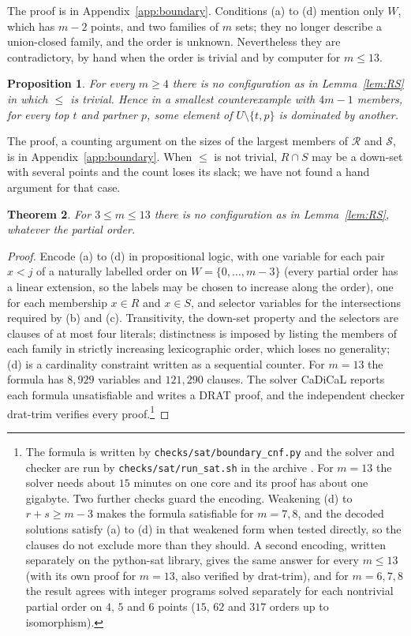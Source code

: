 \documentclass[aps,prd,twocolumn,superscriptaddress,nofootinbib,longbibliography,floatfix,amsmath,amssymb,10pt]{revtex4-2}
\theoremstyle{plain}
\newtheorem{theorem}{Theorem}[section]
\newtheorem{proposition}[theorem]{Proposition}
\theoremstyle{definition}
\theoremstyle{plain}
\begin{document}
The proof is in Appendix~\ref{app:boundary}. Conditions (a) to (d) mention only $W$, which has $m-2$ points, and two families of $m$ sets; they no longer describe a union-closed family, and the order is unknown. Nevertheless they are contradictory, by hand when the order is trivial and by computer for $m\le13$.

\begin{proposition}\label{prop:nodom}
For every $m\ge4$ there is no configuration as in Lemma~\ref{lem:RS} in which $\le$ is trivial. Hence in a smallest counterexample with $4m-1$ members, for every top $t$ and partner $p$, some element of $U\setminus\{t,p\}$ is dominated by another.
\end{proposition}

The proof, a counting argument on the sizes of the largest members of $\mathcal R$ and $\mathcal S$, is in Appendix~\ref{app:boundary}. When $\le$ is not trivial, $R\cap S$ may be a down-set with several points and the count loses its slack; we have not found a hand argument for that case.

\begin{theorem}\label{thm:sat}
For $3\le m\le 13$ there is no configuration as in Lemma~\ref{lem:RS}, whatever the partial order.
\end{theorem}

\begin{proof}
Encode (a) to (d) in propositional logic, with one variable for each pair $x<j$ of a naturally labelled order on $W=\{0,\dots,m-3\}$ (every partial order has a linear extension, so the labels may be chosen to increase along the order), one for each membership $x\in R$ and $x\in S$, and selector variables for the intersections required by (b) and (c). Transitivity, the down-set property and the selectors are clauses of at most four literals; distinctness is imposed by listing the members of each family in strictly increasing lexicographic order, which loses no generality; (d) is a cardinality constraint written as a sequential counter. For $m=13$ the formula has $8{,}929$ variables and $121{,}290$ clauses. The solver CaDiCaL reports each formula unsatisfiable and writes a DRAT proof, and the independent checker drat-trim verifies every proof.\footnote{The formula is written by \texttt{checks/sat/boundary\_cnf.py} and the solver and checker are run by \texttt{checks/sat/run\_sat.sh} in the archive \cite{BB26z}. For $m=13$ the solver needs about $15$ minutes on one core and its proof has about one gigabyte. Two further checks guard the encoding. Weakening (d) to $r+s\ge m-3$ makes the formula satisfiable for $m=7,8$, and the decoded solutions satisfy (a) to (d) in that weakened form when tested directly, so the clauses do not exclude more than they should. A second encoding, written separately on the python-sat library, gives the same answer for every $m\le13$ (with its own proof for $m=13$, also verified by drat-trim), and for $m=6,7,8$ the result agrees with integer programs solved separately for each nontrivial partial order on $4$, $5$ and $6$ points ($15$, $62$ and $317$ orders up to isomorphism).}
\end{proof}
\end{document}
